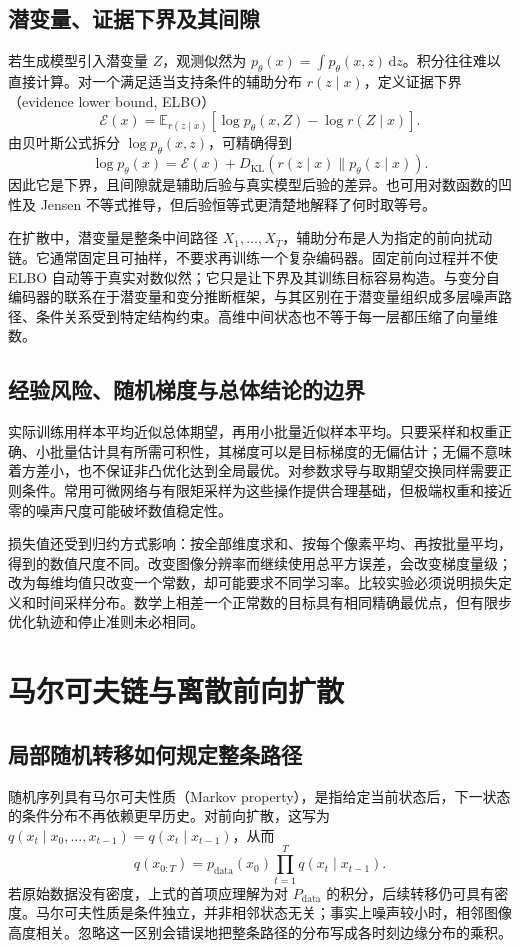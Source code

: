\documentclass[UTF8,12pt,a4paper,fontset=fandol]{ctexart}
\begin{document}
\subsection{潜变量、证据下界及其间隙}
若生成模型引入潜变量 $Z$，观测似然为 $p_\theta(x)=\int p_\theta(x,z)\,\mathrm dz$。积分往往难以直接计算。对一个满足适当支持条件的辅助分布 $r(z\mid x)$，定义证据下界（evidence lower bound, ELBO）
\begin{equation}
 \mathcal E(x)=\mathbb E_{r(z\mid x)}[\log p_\theta(x,Z)-\log r(Z\mid x)].
 \label{eq:diff-elbo-general}
\end{equation}
由贝叶斯公式拆分 $\log p_\theta(x,z)$，可精确得到
\[
 \log p_\theta(x)=\mathcal E(x)+D_{\mathrm{KL}}(r(z\mid x)\|p_\theta(z\mid x)).
\]
因此它是下界，且间隙就是辅助后验与真实模型后验的差异。也可用对数函数的凹性及 Jensen 不等式推导，但后验恒等式更清楚地解释了何时取等号。

在扩散中，潜变量是整条中间路径 $X_1,\ldots,X_T$，辅助分布是人为指定的前向扰动链。它通常固定且可抽样，不要求再训练一个复杂编码器。固定前向过程并不使 ELBO 自动等于真实对数似然；它只是让下界及其训练目标容易构造。与变分自编码器的联系在于潜变量和变分推断框架，与其区别在于潜变量组织成多层噪声路径、条件关系受到特定结构约束。高维中间状态也不等于每一层都压缩了向量维数。

\subsection{经验风险、随机梯度与总体结论的边界}
实际训练用样本平均近似总体期望，再用小批量近似样本平均。只要采样和权重正确、小批量估计具有所需可积性，其梯度可以是目标梯度的无偏估计；无偏不意味着方差小，也不保证非凸优化达到全局最优。对参数求导与取期望交换同样需要正则条件。常用可微网络与有限矩采样为这些操作提供合理基础，但极端权重和接近零的噪声尺度可能破坏数值稳定性。

损失值还受到归约方式影响：按全部维度求和、按每个像素平均、再按批量平均，得到的数值尺度不同。改变图像分辨率而继续使用总平方误差，会改变梯度量级；改为每维均值只改变一个常数，却可能要求不同学习率。比较实验必须说明损失定义和时间采样分布。数学上相差一个正常数的目标具有相同精确最优点，但有限步优化轨迹和停止准则未必相同。

\section{马尔可夫链与离散前向扩散}
\label{sec:diff-forward}
\subsection{局部随机转移如何规定整条路径}
随机序列具有马尔可夫性质（Markov property），是指给定当前状态后，下一状态的条件分布不再依赖更早历史。对前向扩散，这写为 $q(x_t\mid x_0,\ldots,x_{t-1})=q(x_t\mid x_{t-1})$，从而
\[
 q(x_{0:T})=p_{\mathrm{data}}(x_0)\prod_{t=1}^{T}q(x_t\mid x_{t-1}).
\]
若原始数据没有密度，上式的首项应理解为对 $P_{\mathrm{data}}$ 的积分，后续转移仍可具有密度。马尔可夫性质是条件独立，并非相邻状态无关；事实上噪声较小时，相邻图像高度相关。忽略这一区别会错误地把整条路径的分布写成各时刻边缘分布的乘积。
\end{document}
